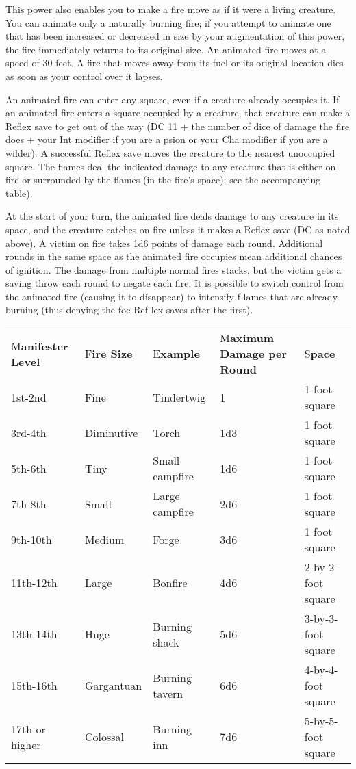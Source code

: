 \documentclass{article}
\begin{document}
This power also enables you to make a fire move as if it were a living creature. 
You can animate only a naturally burning fire; if you attempt to animate one that 
has been increased or decreased in size by your augmentation of this power, the 
fire immediately returns to its original size. An animated fire moves at a speed 
of 30 feet. A fire that moves away from its fuel or its original location dies 
as soon as your control over it lapses. 

An animated fire can enter any square, even if a creature already occupies it. 
If an animated fire enters a square occupied by a creature, that creature can make 
a Reflex save to get out of the way (DC 11 + the number of dice of damage the fire 
does + your Int modifier if you are a psion or your Cha modifier if you are a wilder). 
A successful Reflex save moves the creature to the nearest unoccupied square. The 
flames deal the indicated damage to any creature that is either on fire or surrounded 
by the flames (in the fire's space); see the accompanying table).

At the start of your turn, the animated fire deals damage to any creature in its 
space, and the creature catches on fire unless it makes a Reflex save (DC as noted 
above). A victim on fire takes 1d6 points of damage each round. Additional rounds 
in the same space as the animated fire occupies mean additional chances of ignition. 
The damage from multiple normal fires stacks, but the victim gets a saving throw 
each round to negate each fire. It is possible to switch control from the animated 
fire (causing it to disappear) to intensify f lames that are already burning (thus 
denying the foe Ref lex saves after the first).

\vspace{12pt}
\begin{tabular}{|>{\raggedright}p{55pt}|>{\raggedright}p{34pt}|>{\raggedright}p{45pt}|>{\raggedright}p{64pt}|>{\raggedright}p{89pt}|}
\hline
\multicolumn{5}{|p{290pt}|}{C\textbf{ontrol Flames}}\tabularnewline
\hline
M\textbf{anifester Level } & F\textbf{ire Size } & E\textbf{xample } & M\textbf{aximum 
Damage per Round} & S\textbf{pace}\tabularnewline
\hline
1st-2nd & Fine & Tindertwig & 1 & 1 foot square\tabularnewline
\hline
3rd-4th & Diminutive & Torch & 1d3 & 1 foot square\tabularnewline
\hline
5th-6th & Tiny & Small campfire & 1d6 & 1 foot square\tabularnewline
\hline
7th-8th & Small & Large campfire & 2d6 & 1 foot square\tabularnewline
\hline
9th-10th & Medium & Forge & 3d6 & 1 foot square\tabularnewline
\hline
11th-12th & Large & Bonfire & 4d6 & 2-by-2-foot square\tabularnewline
\hline
13th-14th & Huge & Burning shack & 5d6 & 3-by-3-foot square\tabularnewline
\hline
15th-16th & Gargantuan & Burning tavern & 6d6 & 4-by-4-foot square\tabularnewline
\hline
17th or higher & Colossal & Burning inn & 7d6 & 5-by-5-foot square\tabularnewline
\hline
\end{tabular}
\end{document}

